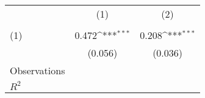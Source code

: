 {
\def\sym#1{\ifmmode^{#1}\else\(^{#1}\)\fi}
\begin{tabular}{l*{2}{c}}
\hline\hline
                    &\multicolumn{1}{c}{(1)}&\multicolumn{1}{c}{(2)}\\
                    &\multicolumn{1}{c}{} &\multicolumn{1}{c}{} \\
\hline
(1)                 &       0.472\sym{***}&       0.208\sym{***}\\
                    &     (0.056)         &     (0.036)         \\
\hline
Observations        &                     &                     \\
\(R^{2}\)           &                     &                     \\
\hline\hline
\end{tabular}
}
